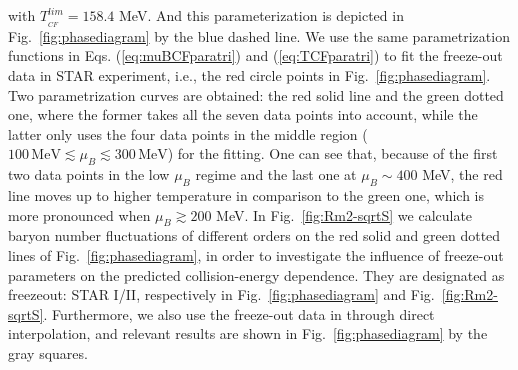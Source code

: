 \documentclass[%
reprint,
superscriptaddress,
showpacs,preprintnumbers,
 amsmath,amssymb,
 aps,
prd,
]{revtex4-1}
\def\Fig#1{Fig.~\ref{#1}} \def\Tab#1{Tab.~\ref{#1}}
\begin{document}
with $T^{lim}_{_{CF}}=158.4$ MeV. And this parameterization is depicted in \Fig{fig:phasediagram} by the blue dashed line. We use the same parametrization functions in Eqs. (\ref{eq:muBCFparatri}) and (\ref{eq:TCFparatri}) to fit the freeze-out data in STAR experiment, i.e., the red circle points in \Fig{fig:phasediagram}. Two parametrization curves are obtained: the red solid line and the green dotted one, where the former takes all the seven data points into account, while the latter only uses the four data points in the middle region ($100\,\mathrm{MeV}\lesssim\mu_B\lesssim 300\,\mathrm{MeV}$) for the fitting. One can see that, because of the first two data points in the low $\mu_B$ regime and the last one at $\mu_B\sim 400$ MeV, the red line moves up to higher temperature in comparison to the green one, which is more pronounced when $\mu_B\gtrsim 200$ MeV. In \Fig{fig:Rm2-sqrtS} we calculate baryon number fluctuations of different orders on the red solid and green dotted lines of \Fig{fig:phasediagram}, in order to investigate the influence of freeze-out parameters on the predicted collision-energy dependence. They are designated as freezeout: STAR I/II, respectively in \Fig{fig:phasediagram} and \Fig{fig:Rm2-sqrtS}. Furthermore, we also use the freeze-out data in \cite{Andronic:2017pug} through direct interpolation, and relevant results are shown in \Fig{fig:phasediagram} by the gray squares. 
\end{document}
